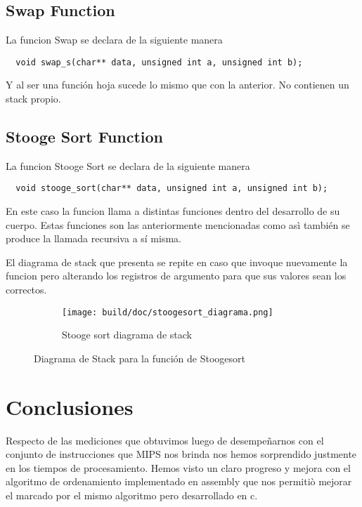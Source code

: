 \documentclass[a4paper,11pt]{article}
\begin{document}
\subsection{Swap Function}

La funcion Swap se declara de la siguiente manera

\begin{lstlisting}
  void swap_s(char** data, unsigned int a, unsigned int b);
\end{lstlisting}

Y al ser una función hoja sucede lo mismo que con la anterior.
No contienen un stack propio.

\subsection{Stooge Sort Function}

La funcion Stooge Sort se declara de la siguiente manera

\begin{lstlisting}
  void stooge_sort(char** data, unsigned int a, unsigned int b);
\end{lstlisting}

En este caso la funcion llama a distintas funciones dentro
del desarrollo de su cuerpo.
Estas funciones son las anteriormente mencionadas como asì 
también se produce la llamada recursiva a sí misma.

El diagrama de stack que presenta se repite en caso que invoque
nuevamente la funcion pero alterando los registros de argumento
para que sus valores sean los correctos.

\begin{figure}
  \begin{subfigure}[b]{\textwidth}
    \centering
    \texttt{[image: build/doc/stoogesort\_diagrama.png]}
    \caption{Stooge sort diagrama de stack}
  \end{subfigure}%
  \caption{Diagrama de Stack para la función de Stoogesort}\label{fig:speedup}
\end{figure}

\FloatBarrier

\section{Conclusiones}

Respecto de las mediciones que obtuvimos luego de desempeñarnos con el
conjunto de instrucciones que MIPS nos brinda nos hemos sorprendido 
justmente en los tiempos de procesamiento.
Hemos visto un claro progreso y mejora con el algoritmo de 
ordenamiento implementado en assembly que nos permitiò mejorar el 
marcado por el mismo algoritmo pero desarrollado en c.
\end{document}
